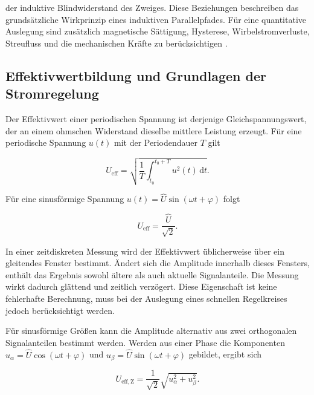 der induktive Blindwiderstand des Zweiges. Diese Beziehungen beschreiben das
grundsätzliche Wirkprinzip eines induktiven Parallelpfades. Für eine
quantitative Auslegung sind zusätzlich magnetische Sättigung, Hysterese,
Wirbelstromverluste, Streufluss und die mechanischen Kräfte zu berücksichtigen
\autocite[Kap.~2 und 6]{rossmann2020magnetismus}.


\subsection{Effektivwertbildung und Grundlagen der Stromregelung}
\label{sec:effektivwert_stromregelung}

Der Effektivwert einer periodischen Spannung ist derjenige Gleichspannungswert,
der an einem ohmschen Widerstand dieselbe mittlere Leistung erzeugt. Für eine
periodische Spannung \(u(t)\) mit der Periodendauer \(T\) gilt

\begin{equation}
  U_{\mathrm{eff}}
  =
  \sqrt{
    \frac{1}{T}
    \int_{t_0}^{t_0+T}u^2(t)\,\mathrm{d}t
  }.
  \label{eq:effektivwert_allgemein}
\end{equation}

Für eine sinusförmige Spannung
\(u(t)=\hat U\sin(\omega t+\varphi)\) folgt

\begin{equation}
  U_{\mathrm{eff}}
  =
  \frac{\hat U}{\sqrt{2}}.
  \label{eq:effektivwert_sinus}
\end{equation}

In einer zeitdiskreten Messung wird der Effektivwert üblicherweise über ein
gleitendes Fenster bestimmt. Ändert sich die Amplitude innerhalb dieses
Fensters, enthält das Ergebnis sowohl ältere als auch aktuelle Signalanteile.
Die Messung wirkt dadurch glättend und zeitlich verzögert. Diese Eigenschaft
ist keine fehlerhafte Berechnung, muss bei der Auslegung eines schnellen
Regelkreises jedoch berücksichtigt werden.

Für sinusförmige Größen kann die Amplitude alternativ aus zwei orthogonalen
Signalanteilen bestimmt werden. Werden aus einer Phase die Komponenten
\(u_{\alpha}=\hat U\cos(\omega t+\varphi)\) und
\(u_{\beta}=\hat U\sin(\omega t+\varphi)\) gebildet, ergibt sich

\begin{equation}
  U_{\mathrm{eff,Z}}
  =
  \frac{1}{\sqrt{2}}
  \sqrt{u_{\alpha}^2+u_{\beta}^2}.
  \label{eq:effektivwert_orthogonales_signal}
\end{equation}

